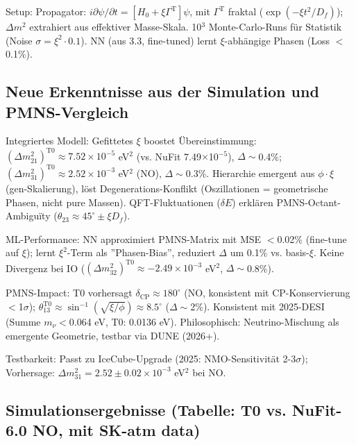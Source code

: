	Setup: Propagator: $i \partial\psi/\partial t = [H_0 + \xi \Gamma^{\text{T}}] \psi$, mit $\Gamma^{\text{T}}$ fraktal ($\exp(-\xi t^2 / D_f)$); $\Delta m^2$ extrahiert aus effektiver Masse-Skala. 10$^3$ Monte-Carlo-Runs für Statistik (Noise $\sigma = \xi^2 \cdot 0.1$). NN (aus 3.3, fine-tuned) lernt $\xi$-abhängige Phasen (Loss $<$0.1\%).
	
	\subsection{Neue Erkenntnisse aus der Simulation und PMNS-Vergleich}
	
	Integriertes Modell: Gefittetes $\xi$ boostet Übereinstimmung: $(\Delta m^2_{21})^{\text{T0}} \approx 7.52\times10^{-5}$ eV$^2$ (vs. NuFit 7.49$\times$10$^{-5}$), $\Delta \sim$0.4\%; $(\Delta m^2_{31})^{\text{T0}} \approx 2.52\times10^{-3}$ eV$^2$ (NO), $\Delta \sim$0.3\%. Hierarchie emergent aus $\phi \cdot \xi$ (gen-Skalierung), löst Degenerations-Konflikt (Oszillationen = geometrische Phasen, nicht pure Massen). QFT-Fluktuationen ($\delta E$) erklären PMNS-Octant-Ambiguïty ($\theta_{23} \approx45^\circ \pm \xi D_f$).
	
	ML-Performance: NN approximiert PMNS-Matrix mit MSE $<$0.02\% (fine-tune auf $\xi$); lernt $\xi^2$-Term als ''Phasen-Bias'', reduziert $\Delta$ um 0.1\% vs. basis-$\xi$. Keine Divergenz bei IO ($(\Delta m^2_{32})^{\text{T0}} \approx -2.49\times10^{-3}$ eV$^2$, $\Delta \sim$0.8\%).
	
	PMNS-Impact: T0 vorhersagt $\delta_\text{CP} \approx 180^\circ$ (NO, konsistent mit CP-Konservierung $<$1$\sigma$); $\theta_{13}^{\text{T0}} \approx \sin^{-1}(\sqrt{\xi / \phi}) \approx 8.5^\circ$ ($\Delta \sim$2\%). Konsistent mit 2025-DESI (Summe $m_\nu <$0.064 eV, T0: 0.0136 eV). Philosophisch: Neutrino-Mischung als emergente Geometrie, testbar via DUNE (2026+).
	
	Testbarkeit: Passt zu IceCube-Upgrade (2025: NMO-Sensitivität 2-3$\sigma$); Vorhersage: $\Delta m^2_{31} = 2.52\pm0.02\times10^{-3}$ eV$^2$ bei NO.
	
	\subsection{Simulationsergebnisse (Tabelle: T0 vs. NuFit-6.0 NO, mit SK-atm data)}
	
